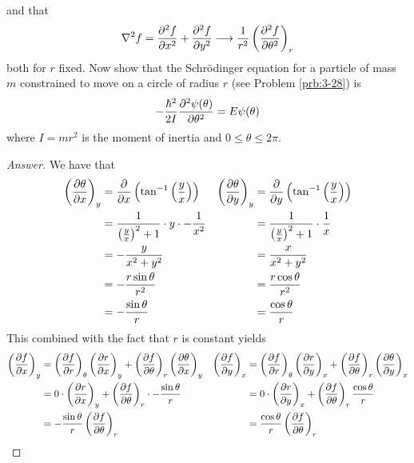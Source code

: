 \documentclass[../notes.tex]{subfiles}
\begin{document}
\begin{enumerate}[label={\textbf{5-\arabic*.}},ref={5-\arabic*}]
\begin{equation*}
    \end{equation*}
    and that
    \begin{equation*}
        \nabla^2f = \pdv[2]{f}{x}+\pdv[2]{f}{y} \longrightarrow \frac{1}{r^2}\left( \pdv[2]{f}{\theta} \right)_r
    \end{equation*}
    both for $r$ fixed. Now show that the Schr\"{o}dinger equation for a particle of mass $m$ constrained to move on a circle of radius $r$ (see Problem \ref{prb:3-28}) is
    \begin{equation*}
        -\frac{\hbar^2}{2I}\pdv[2]{\psi(\theta)}{\theta} = E\psi(\theta)
    \end{equation*}
    where $I=mr^2$ is the moment of inertia and $0\leq\theta\leq 2\pi$.
    \begin{proof}[Answer]
        We have that
        \begin{align*}
            \left( \pdv{\theta}{x} \right)_y &= \pdv{x}\left( \tan^{-1}\left( \frac{y}{x} \right) \right)&
                \left( \pdv{\theta}{y} \right)_y &= \pdv{y}\left( \tan^{-1}\left( \frac{y}{x} \right) \right)\\
            &= \frac{1}{\left( \frac{y}{x} \right)^2+1}\cdot y\cdot -\frac{1}{x^2}&
                &= \frac{1}{\left( \frac{y}{x} \right)^2+1}\cdot\frac{1}{x}\\
            &= -\frac{y}{x^2+y^2}&
                &= \frac{x}{x^2+y^2}\\
            &= -\frac{r\sin\theta}{r^2}&
                &= \frac{r\cos\theta}{r^2}\\
            &= -\frac{\sin\theta}{r}&
                &= \frac{\cos\theta}{r}
        \end{align*}
        This combined with the fact that $r$ is constant yields
        \begin{align*}
            \left( \pdv{f}{x} \right)_y &= \left( \pdv{f}{r} \right)_\theta\left( \pdv{r}{x} \right)_y+\left( \pdv{f}{\theta} \right)_r\left( \pdv{\theta}{x} \right)_y&
                \left( \pdv{f}{y} \right)_x &= \left( \pdv{f}{r} \right)_\theta\left( \pdv{r}{y} \right)_x+\left( \pdv{f}{\theta} \right)_r\left( \pdv{\theta}{y} \right)_x\\
            &= 0\cdot\left( \pdv{r}{x} \right)_y+\left( \pdv{f}{\theta} \right)_r\cdot -\frac{\sin\theta}{r}&
                &= 0\cdot\left( \pdv{r}{y} \right)_x+\left( \pdv{f}{\theta} \right)_r\frac{\cos\theta}{r}\\
            &= -\frac{\sin\theta}{r}\left( \pdv{f}{\theta} \right)_r&
                &= \frac{\cos\theta}{r}\left( \pdv{f}{\theta} \right)_r

\end{align*}
\end{proof}
\end{enumerate}
\end{document}
